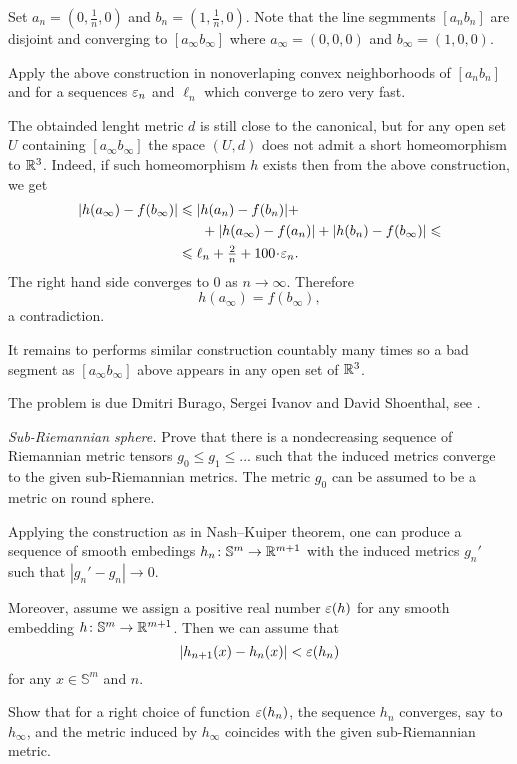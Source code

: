 Set $a_n=(0,\tfrac1n,0)$ and $b_n=(1,\tfrac1n,0)$.
Note that the line segmments $[a_nb_n]$ are disjoint and converging
to $[a_\infty b_\infty]$
where $a_\infty=(0,0,0)$ and $b_\infty=(1,0,0)$.

Apply the above construction in nonoverlaping convex neighborhoods of $[a_nb_n]$ 
and for a sequences 
$\varepsilon_n$ and $\ell_n$ 
which converge to zero very fast.

The obtainded lenght metric $d$ is still close to the canonical,
but for any open set $U$ containing $[a_\infty b_\infty]$
the space $(U,d)$ does not admit 
a short homeomorphism to $\mathbb{R}^3$.
Indeed, if such homeomorphism $h$
exists then 
from the above construction,
we get 
\begin{align*}
|h(a_\infty)-f(b_\infty)|
&\le 
|h(a_n)-f(b_n)|
+
\\
&\ \ \ \ \ +
|h(a_\infty)-f(a_n)|
+
|h(b_n)-f(b_\infty)|
\le
\\
&\le
\ell_n+\tfrac2n+100\cdot\eps_n.
\end{align*}
The right hand side converges to $0$ as $n\to\infty$.
Therefore 
\[h(a_\infty)=f(b_\infty),\] 
a contradiction.

It remains to performs similar construction countably many times so a bad segment as $[a_\infty b_\infty]$ above
appears in any open set of $\mathbb{R}^3$.


The problem is due
Dmitri Burago, 
Sergei Ivanov 
and David Shoenthal,
see \cite{BIS}.

\textit{Sub-Riemannian sphere.}
Prove that there is a nondecreasing sequence of Riemannian metric tensors
$g_0\le g_1\le ...$ such that the induced metrics converge to the given sub-Riemannian metrics.
The metric $g_0$ can be assumed to be a metric on round sphere.

Applying the construction as in Nash--Kuiper theorem,
one can produce a sequence of smooth embedings $h_n\colon\mathbb{S}^m\to \mathbb{R}^{m+1}$ with the induced metrics $g_n'$
such that $|g_n'-g_n|\to 0$.

Moreover, assume we assign a positive real number $\varepsilon(h)$ for any smooth embedding $h\colon\mathbb{S}^m\to\mathbb{R}^{m+1}$.
Then we can assume that 
\[|h_{n+1}(x)-h_n(x)|<\varepsilon(h_n)\] for any $x\in \mathbb{S}^m$ and $n$.

Show that for a right choice of function $\varepsilon(h_n)$,
the sequence $h_n$ converges, say to $h_\infty$, 
and the metric induced by $h_\infty$ coincides with the given sub-Riemannian metric.

